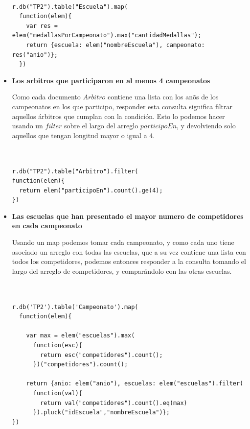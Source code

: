 \begin{itemize}
{\begin{verbatim}

r.db("TP2").table("Escuela").map(
  function(elem){
    var res = elem("medallasPorCampeonato").max("cantidadMedallas");
    return {escuela: elem("nombreEscuela"), campeonato: res("anio")};
  })

\end{verbatim}
}

\item{\textbf{Los arbitros que participaron en al menos 4 campeonatos}

Como cada documento $Arbitro$ contiene una lista con los an\~os de los campeonatos en los que participo, responder esta consulta significa filtrar aquellos árbitros que cumplan con la condición. Esto lo podemos hacer usando un $filter$ sobre el largo del arreglo $participoEn$, y devolviendo solo aquellos que tengan longitud mayor o igual a 4. 

\begin{verbatim}


r.db("TP2").table("Arbitro").filter(
function(elem){
  return elem("participoEn").count().ge(4);
})

\end{verbatim}
}

\item{\textbf{Las escuelas que han presentado el mayor numero de competidores en cada campeonato}

Usando un map podemos tomar cada campeonato, y como cada uno tiene asociado un arreglo con todas las escuelas, que a su vez contiene una lista con todos los competidores, podemos entonces responder a la consulta tomando el largo del arreglo de competidores, y comparándolo con las otras escuelas.

\begin{verbatim}


r.db('TP2').table('Campeonato').map(
  function(elem){

    var max = elem("escuelas").max(
      function(esc){
        return esc("competidores").count();
      })("competidores").count();
    
    return {anio: elem("anio"), escuelas: elem("escuelas").filter(
      function(val){
      	return val("competidores").count().eq(max)
      }).pluck("idEscuela","nombreEscuela")};
})

\end{verbatim}
}



\end{itemize}
